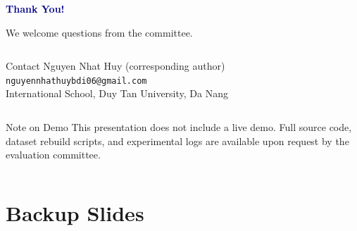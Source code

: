 \documentclass[aspectratio=169]{beamer}
\begin{document}
\begin{frame}[plain]
\begin{center}
\vspace{0.8cm}
{\Huge \textcolor{darkblue}{\textbf{Thank You!}}}

\vspace{0.4cm}
{\large We welcome questions from the committee.}

\vspace{0.7cm}
\begin{columns}
\begin{block}{Contact}
\centering
Nguyen Nhat Huy (corresponding author)\\
\texttt{nguyennhathuybdi06@gmail.com}\\[0.1cm]
{\small International School, Duy Tan University, Da Nang}
\end{block}
\end{columns}

\vspace{0.5cm}
\begin{columns}
\begin{alertblock}{\small Note on Demo}
\centering
\small This presentation does not include a live demo. Full source code, dataset rebuild scripts, and experimental logs are available upon request by the evaluation committee.
\end{alertblock}
\end{columns}
\end{center}
\end{frame}

\appendix
\section{Backup Slides}
\end{document}
